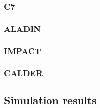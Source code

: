 \documentclass[preprint,12pt]{elsarticle}
\begin{document}
\subsubsection{C7}
\label{sec:C7code}

\subsubsection{ALADIN}
\label{sec:ALADINcode}

\subsubsection{IMPACT}
\label{sec:IMPACTcode}

\subsubsection{CALDER}
\label{sec:CALDERcode}

\subsection{Simulation results}
\label{sec:SimulationResults}
\end{document}
